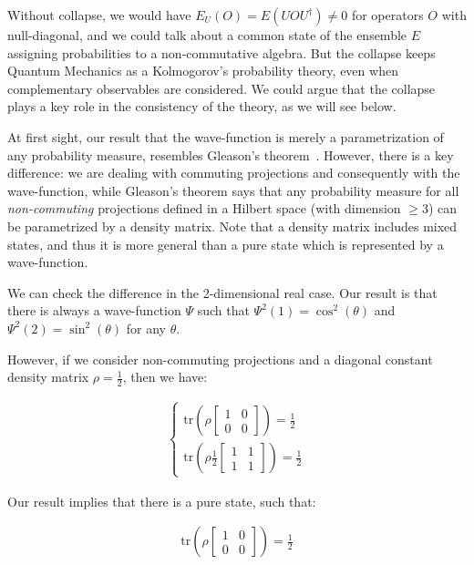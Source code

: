 \documentclass[11pt]{book}
\begin{document}
Without collapse, we would have \(E_U(O)=E(U O U^\dagger)\neq 0\) for
operators \(O\) with null-diagonal, and we could talk about a common
state of the ensemble \(E\) assigning probabilities to a non-commutative
algebra. But the collapse keeps Quantum Mechanics as a Kolmogorov's
probability theory, even when complementary observables are considered.
We could argue that the collapse plays a key role in the consistency of
the theory, as we will see below.

At first sight, our result that the wave-function is merely a
parametrization of any probability measure, resembles Gleason's
theorem~\cite{Gleason1957Measures}\cite{Dvurecenskij2013Gleasonux2019s}. However, there is a key difference: we are dealing with
commuting projections and consequently with the wave-function, while
Gleason's theorem says that any probability measure for all
\emph{non-commuting} projections defined in a Hilbert space (with
dimension \(\geq 3\)) can be parametrized by a density matrix. Note that
a density matrix includes mixed states, and thus it is more general than
a pure state which is represented by a wave-function.

We can check the difference in the 2-dimensional real case. Our result
is that there is always a wave-function \(\Psi\) such that
\(\Psi^2(1)=\cos^2(\theta)\) and \(\Psi^2(2)=\sin^2(\theta)\) for any
\(\theta\).

However, if we consider non-commuting projections and a diagonal
constant density matrix \(\rho=\frac{1}{2}\), then we have:

\begin{equation}\begin{aligned}
\begin{cases}
\mathrm{tr}(\rho \left[\begin{smallmatrix} 1 & 0\\ 0 & 0 \end{smallmatrix}\right])=\frac{1}{2}\\
\mathrm{tr}(\rho \frac{1}{2}\left[\begin{smallmatrix} 1 & 1\\ 1 & 1 \end{smallmatrix}\right])=\frac{1}{2}
\end{cases}\end{aligned}\end{equation}

Our result implies that there is a pure state, such that:

\begin{equation}\begin{aligned}
\mathrm{tr}(\rho \left[\begin{smallmatrix} 1 & 0\\ 0 & 0 \end{smallmatrix}\right])=\frac{1}{2}\end{aligned}\end{equation}
\end{document}
